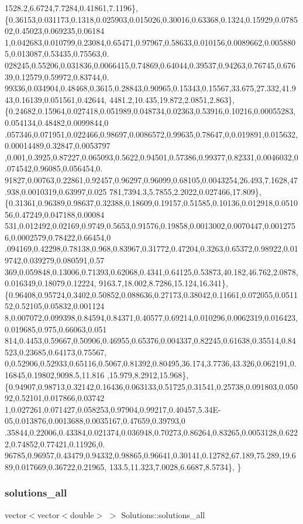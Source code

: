\begin{DoxyCode}
      1528.2,6.6724,7.7284,0.41861,7.1196\},
\{0.36153,0.031173,0.1318,0.025903,0.015026,0.30016,0.63368,0.1324,0.15929,0.078502,0.45023,0.069235,0.06184
      1,0.042683,0.010799,0.23084,0.65471,0.97967,0.58633,0.010156,0.0089662,0.0058805,0.013087,0.53435,0.75563,0.
      028245,0.55206,0.031836,0.0066415,0.74869,0.64044,0.39537,0.94263,0.76745,0.67639,0.12579,0.59972,0.83744,0.
      99336,0.034904,0.48468,0.3615,0.28843,0.90965,0.15343,0.15567,33.675,27.332,41.943,0.16139,0.051561,0.42644,
      4481.2,10.435,19.872,2.0851,2.863\},
\{0.24682,0.15964,0.027418,0.051989,0.048734,0.02363,0.53916,0.10216,0.00055283,0.054134,0.48482,0.0099844,0
      .057346,0.071951,0.022466,0.98697,0.0086572,0.99635,0.78647,0,0.019891,0.015632,0.00014489,0.32847,0.0053797
      ,0.001,0.3925,0.87227,0.065093,0.5622,0.94501,0.57386,0.99377,0.82331,0.0046032,0.074542,0.96085,0.056454,0.
      91827,0.00763,0.22861,0.92457,0.96297,0.96099,0.68105,0.0043254,26.493,7.1628,47.938,0.0010319,0.63997,0.025
      781,7394.3,5.7855,2.2022,0.027466,17.809\},
\{0.31361,0.96389,0.98637,0.32388,0.18609,0.19157,0.51585,0.10136,0.012918,0.051056,0.47249,0.047188,0.00084
      531,0.012492,0.02169,0.9749,0.5653,0.91576,0.19858,0.0013002,0.0070447,0.0012756,0.0002579,0.78422,0.66454,0
      .094169,0.42298,0.78138,0.968,0.83967,0.31772,0.47204,0.3263,0.65372,0.98922,0.019742,0.039279,0.080591,0.57
      369,0.059848,0.13006,0.71393,0.62068,0.4341,0.64125,0.53873,40.182,46.762,2.0878,0.016349,0.18079,0.12224,
      9163.7,18.002,8.7286,15.124,16.341\},
\{0.96408,0.95724,0.3402,0.50852,0.088636,0.27173,0.38042,0.11661,0.072055,0.051152,0.52105,0.05832,0.001124
      8,0.007072,0.099398,0.84594,0.84371,0.40577,0.69214,0.010296,0.0062319,0.016423,0.019685,0.975,0.66063,0.051
      814,0.4453,0.59667,0.50906,0.46955,0.65376,0.004337,0.82245,0.61638,0.35514,0.84523,0.23685,0.64173,0.75567,
      0,0.52906,0.52933,0.65116,0.5067,0.81392,0.80495,36.174,3.7736,43.326,0.062191,0.16845,0.19802,9098.5,11.816
      ,15.979,8.2912,15.968\},
\{0.94907,0.98713,0.32142,0.16436,0.063133,0.51725,0.31541,0.25738,0.091803,0.05092,0.52101,0.017866,0.03742
      1,0.027261,0.071427,0.058253,0.97904,0.99217,0.40457,5.34E-05,0.013876,0.0013688,0.0035167,0.47659,0.39793,0
      .35844,0.22006,0.43384,0.021374,0.036948,0.70273,0.86264,0.83265,0.0053128,0.6222,0.74852,0.77421,0.11926,0.
      96785,0.96957,0.43479,0.94332,0.98865,0.96641,0.30141,0.12782,67.189,75.289,19.689,0.017669,0.36722,0.21965,
      133.5,11.323,7.0028,6.6687,8.5734\},
\}
\end{DoxyCode}
\mbox{\label{namespaceSolutions_a1d52637d01c7e17fcc05a918375a7728_a1d52637d01c7e17fcc05a918375a7728}} 
\subsubsection{\texorpdfstring{solutions\+\_\+all}{solutions\_all}}
{\footnotesize\ttfamily vector$<$vector$<$double$>$ $>$ Solutions\+::solutions\+\_\+all}

